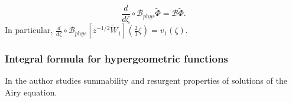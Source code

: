 \documentclass{article}
\newcommand{\borel}{\mathcal{B}}
\theoremstyle{definition}
\theoremstyle{plain}
\begin{document}
\begin{equation}
\frac{d}{d\zeta}\circ\borel_{\textit{phys}}\tilde{\Phi}=\borel\tilde{\Phi}.
\end{equation}
In particular, $\frac{d}{d\zeta}\circ\borel_{\textit{phys}}\left[z^{-1/2}\tilde{W}_{1}\right]\left(\frac{2}{3}\zeta\right)=v_1(\zeta)$. 

%
%
%



\subsubsection{Integral formula for hypergeometric functions}

In \cite{diverg-resurg-i} the author studies summability and resurgent properties of solutions of the Airy equation. 
\end{document}

